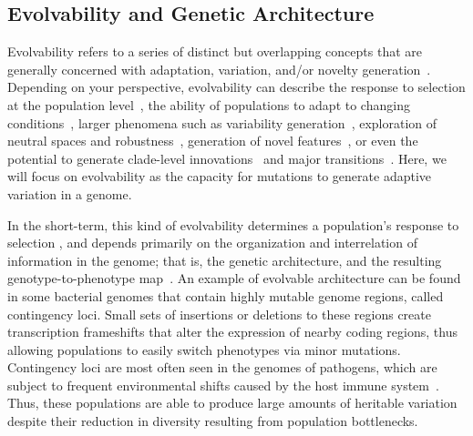 \documentclass[10pt,letterpaper,final]{article}
\begin{document}
\subsection*{Evolvability and Genetic Architecture}
Evolvability refers to a series of distinct but overlapping concepts that are generally concerned with adaptation, variation, and/or novelty generation~\cite{pigliucci_is_2008}. Depending on your perspective, evolvability can describe the response to selection at the population level~\cite{fisher_genetical_1930,houle_comparing_1992}, the ability of populations to adapt to changing conditions~\cite{belle_code_2002}, larger phenomena such as variability generation~\cite{gunter_p._wagner_perspective:_1996}, 
exploration of neutral spaces and robustness~\cite{andreas_wagner_robustness_2005,kitano_biological_2004}, 
generation of novel features~\cite{alberch_genes_1991,brookfield_evolution:_2001}, 
or even the potential to generate clade-level innovations~\cite{kirschner_evolvability_1998} 
and major transitions~\cite{smith_major_1995}. Here, we will focus on evolvability as the capacity for mutations to generate adaptive variation in a genome. 

In the short-term, this kind of evolvability determines a population's response to selection%
, and depends primarily on the organization and interrelation of information in the genome; that is, the genetic architecture, and the resulting genotype-to-phenotype map~\cite{gunter_p._wagner_perspective:_1996}. An example of evolvable architecture can be found in some bacterial genomes that contain highly mutable genome regions, called contingency loci. Small sets of insertions or deletions to these regions create transcription frameshifts that alter the expression of nearby coding regions, thus allowing populations to easily switch phenotypes via minor mutations. Contingency loci are most often seen in the genomes of pathogens, which are subject to frequent environmental shifts caused by the host immune system~\cite{bayliss_simple_2001}. Thus, these populations are able to produce large amounts of heritable variation despite their reduction in diversity resulting from population bottlenecks.
\end{document}
